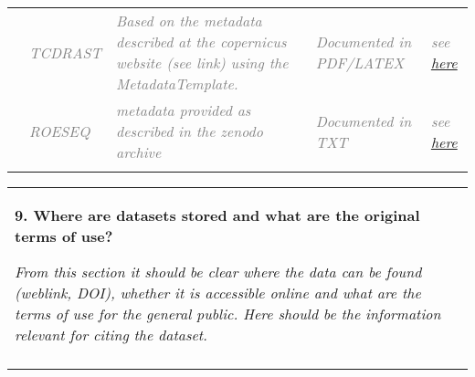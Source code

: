 \documentclass[12pt]{article}
\begin{document}
\begin{table}[H]
\begin{tabular}{p{0.20in}p{}p{1.80in}p{1.00in}p{1.30in}}
\hhline{-----}
\multicolumn{1}{|p{0.20in}}{\textit{\textcolor[HTML]{808080}{D3}}} & %
\multicolumn{1}{|p{1.00in}}{\textit{\textcolor[HTML]{808080}{TCDRAST}}} & %
\multicolumn{1}{|p{1.80in}|}{\textit{\textcolor[HTML]{808080}{Based on the metadata described at the copernicus website (see link) using the MetadataTemplate.}}} & %
\multicolumn{1}{|p{1.00in}|}{\textit{\textcolor[HTML]{808080}{Documented in PDF/LATEX}}} & %
\multicolumn{1}{|p{1.30in}|}{\textit{\textcolor[HTML]{808080}{see \href{https://land.copernicus.eu/pan-european/high-resolution-layers/forests/tree-cover-density/status-maps/2015?tab=metadata}{here}}}} \\ %
\hhline{-----}
\multicolumn{1}{|p{0.20in}}{\textit{\textcolor[HTML]{808080}{D4}}} & %
\multicolumn{1}{|p{1.00in}}{\textit{\textcolor[HTML]{808080}{ROESEQ}}} & %
\multicolumn{1}{|p{1.80in}|}{\textit{\textcolor[HTML]{808080}{metadata provided as described in the zenodo archive}}} & %
\multicolumn{1}{|p{1.00in}|}{\textit{\textcolor[HTML]{808080}{Documented in TXT}}} & %
\multicolumn{1}{|p{1.30in}|}{\textit{\textcolor[HTML]{808080}{see \href{https://doi.org/10.5281/zenodo.1254230}{here}}}} \\ %
\hhline{-----}
\end{tabular}
\end{table}




\newpage



\vspace{\baselineskip}{\fontsize{14pt}{16.8pt}\selectfont \textcolor[HTML]{BC0031}{Data Accessibility}\par}\par

\begin{table}[H]
 			\centering
\begin{tabular}{p{5.99in}}
\hline
\multicolumn{1}{|p{5.99in}|}{\textbf{9. Where are datasets stored and what are the original terms of use?} \par  \par \textit{{From this section it should be clear where the data can be found (weblink, DOI), whether it is accessible online and what are the terms of use for the general public. Here should be the information relevant for citing the dataset.}}} \\
\hhline{-}
\end{tabular}
\end{table}
\end{document}
